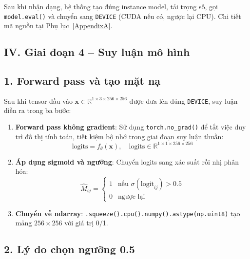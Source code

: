 \begin{sloppypar}
Sau khi nhận dạng, hệ thống tạo đúng instance model, tải trọng số, gọi \texttt{model.eval()} và chuyển sang \texttt{DEVICE} (CUDA nếu có, ngược lại CPU). Chi tiết mã nguồn tại Phụ lục~\ref{AppendixA}.
\end{sloppypar}

\subsection*{IV. Giai đoạn 4 -- Suy luận mô hình}

\subsection*{1. Forward pass và tạo mặt nạ}

Sau khi tensor đầu vào $\mathbf{x} \in \mathbb{R}^{1 \times 3 \times 256 \times 256}$ được đưa lên đúng \texttt{DEVICE}, suy luận diễn ra trong ba bước:

\begin{sloppypar}
\begin{enumerate}
    \item \textbf{Forward pass không gradient}: Sử dụng \texttt{torch.no\_grad()} để tắt việc duy trì đồ thị tính toán, tiết kiệm bộ nhớ trong giai đoạn suy luận thuần:
    \[ \text{logits} = f_\theta(\mathbf{x}), \quad \text{logits} \in \mathbb{R}^{1 \times 1 \times 256 \times 256} \]
    \item \textbf{Áp dụng sigmoid và ngưỡng}: Chuyển logits sang xác suất rồi nhị phân hóa:
    \begin{equation}
        \hat{M}_{ij} = \begin{cases} 1 & \text{nếu } \sigma(\text{logit}_{ij}) > 0.5 \\ 0 & \text{ngược lại} \end{cases}
        \label{eq:threshold}
    \end{equation}
    \item \textbf{Chuyển về ndarray}: \texttt{.squeeze().cpu().numpy().astype(np.uint8)} tạo mảng $256\times256$ với giá trị 0/1.
\end{enumerate}
\end{sloppypar}

\subsection*{2. Lý do chọn ngưỡng 0.5}

